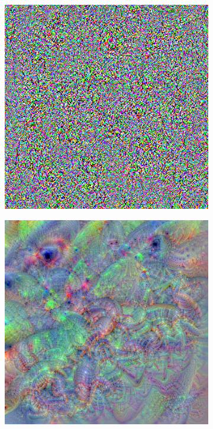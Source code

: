 \newpage
\begin{figure}
    \captionsetup{justification=centering}

    \begin{subfigure}[t]{0.31\textwidth}
        \captionsetup{justification=centering}
        \centering
        \includegraphics[width=.7\linewidth]{figuras/feat_vis/experiments/final/l13/random_image_pl1_lr4e-1_layer28_no-blur.png}
        \caption{}
    \end{subfigure}
    \hfill
    \begin{subfigure}[t]{0.31\textwidth}
        \captionsetup{justification=centering}
        \centering
        \includegraphics[width=.7\linewidth]{figuras/feat_vis/experiments/final/l13/random_image_pl6_lr8e-2_layer28_blur-0.4.png}
        \caption{}
    \end{subfigure}

\end{figure}

